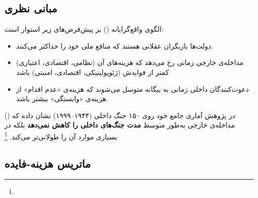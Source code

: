 \subsection{مبانی نظری}
\label{subsec:ch03-realist-theory}

الگوی واقع‌گرایانه () بر پیش‌فرض‌های زیر استوار است:

\begin{itemize}[nosep, rightmargin=1em]
  \item دولت‌ها بازیگران عقلانی هستند که منافع ملی خود را حداکثر می‌کنند.
  \item مداخله‌ی خارجی زمانی رخ می‌دهد که هزینه‌های آن (نظامی، اقتصادی، اعتباری) کمتر از فوایدش (ژئوپولیتیکی، اقتصادی، امنیتی) باشد.
  \item دعوت‌کنندگان داخلی زمانی به بیگانه متوسل می‌شوند که هزینه‌ی «عدم اقدام» از هزینه‌ی «وابستگی» بیشتر باشد.
\end{itemize}

 () در پژوهش آماری جامع خود روی ۱۵۰ جنگ داخلی (۱۹۴۴–۱۹۹۹) نشان داده که مداخله‌ی خارجی به‌طور متوسط \textbf{مدت جنگ‌های داخلی را کاهش نمی‌دهد} بلکه در بسیاری موارد آن را طولانی‌تر می‌کند.%
\footnote{}

\subsection{ماتریس هزینه-فایده}
\label{subsec:ch03-realist-matrix}

